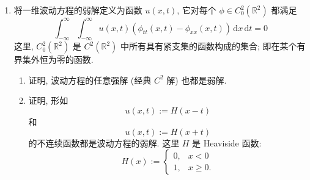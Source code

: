 \begin{enumerate}[label=\thesection.\arabic*.,ref=\thesection.\arabic*,start=25,series=book-problems]
\item\label{ex:discontinuous-weak-wave-solutions} 将一维波动方程的弱解定义为函数 $u(x,t)$, 它对每个 $\phi\in C_0^2(\mathbb{R}^2)$ 都满足
\begin{equation}\label{eq:wave-distributional-form}
\int_{-\infty}^{\infty}\int_{-\infty}^{\infty}u(x,t)(\phi_{tt}(x,t)-\phi_{xx}(x,t))\,\mathrm{d}x\,\mathrm{d}t=0
\end{equation}
这里, $C_0^2(\mathbb{R}^2)$ 是 $C^2(\mathbb{R}^2)$ 中所有具有紧支集的函数构成的集合; 即在某个有界集外恒为零的函数.
\begin{enumerate}[label=(\alph*)]
\item 证明, 波动方程的任意强解 (经典 $C^2$ 解) 也都是弱解.
\item 证明, 形如
\begin{equation}\label{eq:heaviside-right-moving-solution}
u(x,t):=H(x-t)
\end{equation}
和
\begin{equation}\label{eq:heaviside-left-moving-solution}
u(x,t):=H(x+t)
\end{equation}
的不连续函数都是波动方程的弱解. 这里 $H$ 是 Heaviside 函数:
\begin{equation}\label{eq:heaviside-function}
H(x):=\begin{cases}0,&x<0\\1,&x\geq0.\end{cases}
\end{equation}
\end{enumerate}

\end{enumerate}
